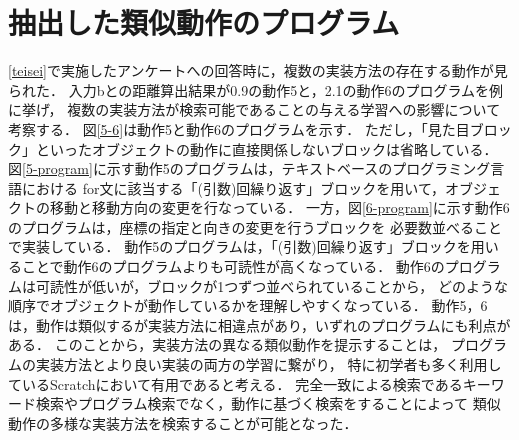 \documentclass[11pt]{jreport}
\begin{document}
\section{抽出した類似動作のプログラム}
\ref{teisei}で実施したアンケートへの回答時に，複数の実装方法の存在する動作が見られた．
入力bとの距離算出結果が0.9の動作5と，2.1の動作6のプログラムを例に挙げ，
複数の実装方法が検索可能であることの与える学習への影響について考察する．
図\ref{5-6}は動作5と動作6のプログラムを示す．
ただし，「見た目ブロック」といったオブジェクトの動作に直接関係しないブロックは省略している．
図\ref{5-program}に示す動作5のプログラムは，テキストベースのプログラミング言語における
for文に該当する「(引数)回繰り返す」ブロックを用いて，オブジェクトの移動と移動方向の変更を行なっている．
一方，図\ref{6-program}に示す動作6のプログラムは，座標の指定と向きの変更を行うブロックを
必要数並べることで実装している．
動作5のプログラムは，「(引数)回繰り返す」ブロックを用いることで動作6のプログラムよりも可読性が高くなっている．
動作6のプログラムは可読性が低いが，ブロックが1つずつ並べられていることから，
どのような順序でオブジェクトが動作しているかを理解しやすくなっている．
動作5，6は，動作は類似するが実装方法に相違点があり，いずれのプログラムにも利点がある．
このことから，実装方法の異なる類似動作を提示することは，
プログラムの実装方法とより良い実装の両方の学習に繋がり，
特に初学者も多く利用しているScratchにおいて有用であると考える．
完全一致による検索であるキーワード検索やプログラム検索でなく，動作に基づく検索をすることによって
類似動作の多様な実装方法を検索することが可能となった．
\end{document}
